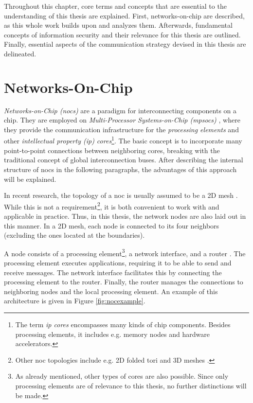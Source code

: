 Throughout this chapter, core terms and concepts that are essential to the understanding of this thesis are explained. First, networks-on-chip are
described, as this whole work builds upon and analyzes them. Afterwards, fundamental concepts of information security and their relevance for this
thesis are outlined. Finally, essential aspects of the communication strategy devised in this thesis are delineated.

\section{Networks-On-Chip}\label{sec:networkonchipfun}
\textit{Networks-on-Chip (\glspl{noc})} are a paradigm for interconnecting components on a chip. They are employed on
\textit{Multi-Processor Systems-on-Chip (\glspl{mpsoc})} \cites(e.g.)(){ivanov05nocintroduction}{biswas15routerattack}{tatas16designingnocs}, where they
provide the communication infrastructure for the \textit{processing elements} and other \textit{intellectual property (\gls{ip}) cores}\footnote{The
term \textit{\gls{ip} cores} encompasses many kinds of chip components. Besides processing elements, it includes e.g. memory nodes and
hardware accelerators.}. The basic concept is to incorporate many point-to-point connections between neighboring cores, breaking with the traditional
concept of global interconnection buses. After describing the internal structure of \glspl{noc} in the following paragraphs, the advantages of this
approach will be explained.

In recent research, the topology of a \gls{noc} is usually assumed to be a 2D mesh
\cites(e.g.)(){frey17hardenednoc}{kumar02networkonchip}{fernandes16nocrouting}{boraten16packetsecurity}. While this is not a
requirement\footnote{Other \gls{noc} topologies include e.g. 2D folded tori and 3D meshes \cite[2]{feero07noc3d}.}, it is both convenient
to work with and applicable in practice. Thus, in this thesis, the network nodes are also laid out in this manner.
In a 2D mesh, each node is connected to its four neighbors (excluding the ones located at the boundaries).

A node consists of a processing element\footnote{As already mentioned, other types of cores are also possible. Since only processing elements are of
relevance to this thesis, no further distinctions will be made.}, a network interface, and a router \cite{dally01routepacketsnotwires}. The processing
element executes applications, requiring it to be able to send and receive messages. The network interface facilitates this by connecting the
processing element to the router. Finally, the router manages the connections to neighboring nodes and the local processing element. An example of
this architecture is given in Figure \vref{fig:nocexample}.

